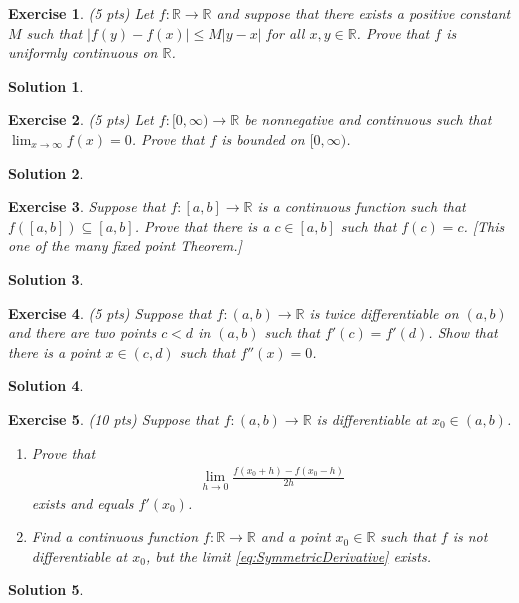 \documentclass[12pt]{article}
\newcommand{\bR}{\mathbb{R}}
\newcommand{\ra}{\rightarrow}
\theoremstyle{plain}
\newtheorem{exer}{\textbf{Exercise}}}
\theoremstyle{plain}
\newtheorem*{sol}{\textbf{Solution}}}
\begin{document}
\begin{exer}
(5 pts)
Let $f : \bR \ra \bR$ and suppose that there exists a positive constant $M$ such that $|f(y) - f(x)| \leq M |y - x|$ for all $x, y \in \bR$. Prove that $f$ is uniformly continuous on $\bR$.
\end{exer}
\begin{sol}

\end{sol}

\begin{exer}
(5 pts)
Let $f : [0, \infty ) \ra \bR$ be nonnegative and continuous such that $\lim_{x \ra \infty} f(x) = 0$. Prove that $f$ is bounded on $[0, \infty )$.
\end{exer}
\begin{sol}

\end{sol}

\begin{exer}
Suppose that $f: [a, b] \ra \bR$ is a continuous function such that $f([a, b]) \subseteq [a, b]$. Prove that there is a $c \in [a, b]$ such that $f(c) = c$. [This one of the many fixed point Theorem.]
\end{exer}
\begin{sol}

\end{sol}

\begin{exer}
(5 pts)
Suppose that $f: (a, b) \ra \bR$ is twice differentiable on $(a,b)$ and there are two points $c  < d$ in $(a ,b)$ such that $f'(c) = f'(d)$. Show that there is a point $x \in (c, d)$ such that $f''(x) = 0$.
\end{exer}
\begin{sol}

\end{sol}

\begin{exer}
(10 pts)
Suppose that $f : (a, b) \ra \bR$ is differentiable at $x_0 \in (a, b)$. 
	\begin{enumerate}[label=\textbf{\alph*)}]
	\item Prove that
	\begin{align}
	\lim_{h \ra 0} \frac{f (x_0 + h) - f(x_0 - h)}{2h} \label{eq:SymmetricDerivative}\tag{$\star$}
	\end{align}
exists and equals $f'(x_0)$.
	\item Find a continuous function $f : \bR \ra \bR$ and a point $x_0 \in \bR$ such that $f$ is not differentiable at $x_0$, but the limit \eqref{eq:SymmetricDerivative} exists.
	\end{enumerate}
\end{exer}
\begin{sol}

\end{sol}
\end{document}
